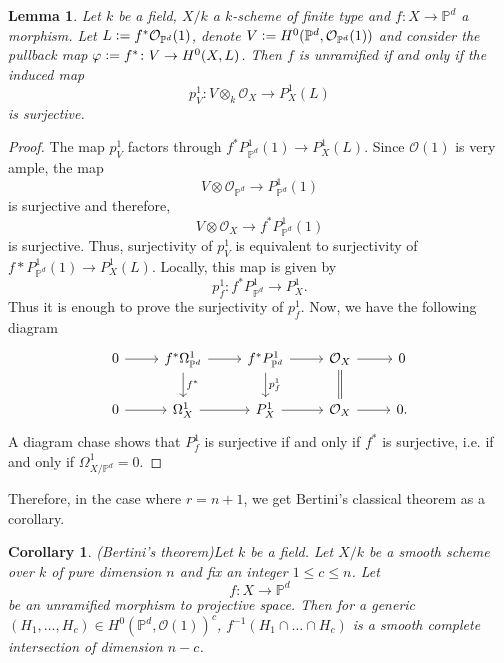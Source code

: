 \documentclass[a4paper,12pt]{amsart}
\newtheorem{corollary}[definition]{Corollary}
\newtheorem{lemma}[definition]{Lemma}
\numberwithin{equation}{section}
\newcommand{\defeq}{\vcentcolon=}
\renewcommand{\leq}{\leqslant}
\renewcommand{\_}{\rule{0.25cm}{0.4pt}}
\begin{document}
\begin{lemma}\label{unramified}
    Let $k$ be a field, $X/k$ a $k$-scheme of finite type and $f\colon X\to\mathbb{P}^{d}$ a morphism. Let $L\defeq f^{\ast}\mathcal{O}_{\mathbb{P}^{d}}(1)$, denote $V\defeq H^{0}(\mathbb{P}^{d},\mathcal{O}_{\mathbb{P}^{d}}(1))$ and consider the pullback map $\varphi\defeq f^{\ast}\colon V\to H^{0}(X,L)$. Then $f$ is unramified if and only if the induced map
    \[
    p^{1}_{V}\colon V\otimes_{k}\mathcal{O}_{X}\to P_{X}^{1}(L)
    \]
    is surjective.
\end{lemma}
\begin{proof}
    The map $p^{1}_{V}$ factors through $f^{\ast} P_{\mathbb{P}^{d}}^{1}(1)\to P^{1}_{X}(L)$. Since $\mathcal{O}(1)$ is very ample, the map
    \[
    V\otimes \mathcal{O}_{\mathbb{P}^{d}}\to P_{\mathbb{P}^{d}}^{1}(1)
    \]
    is surjective and therefore,
    \[
    V\otimes \mathcal{O}_{X}\to f^{\ast}P_{\mathbb{P}^{d}}^{1}(1)
    \]
    is surjective. Thus, surjectivity of $p^{1}_{V}$ is equivalent to surjectivity of $f\ast P_{\mathbb{P}^{d}}^{1}(1)\to P^{1}_{X}(L)$. Locally, this map is given by
    \[
    p^{1}_{f}\colon f^{\ast} P_{\mathbb{P}^{d}}^{1}\to P^{1}_{X}.
    \]
    Thus it is enough to prove the surjectivity of $p^{1}_{f}$. Now, we have the following diagram
    \[
    \begin{tikzcd}
    0\ar[r] & f^{\ast}\Omega^{1}_{\mathbb{P}^{d}}\ar[r]\ar[d, "f^{\ast}"] & f^{\ast}P^{1}_{\mathbb{P}^{d}}\ar[r]\ar[d, "p^{1}_{f}"] & \mathcal{O}_{X}\ar[r]\ar[d, equal] & 0
    \\
    0\ar[r] & \Omega^{1}_{X}\ar[r] & P^{1}_{X}\ar[r] & \mathcal{O}_{X}\ar[r] & 0.
    \end{tikzcd}
    \]
    A diagram chase shows that $P^{1}_{f}$ is surjective if and only if $f^{\ast}$ is surjective, i.e. if and only if $\Omega^{1}_{X/\mathbb{P}^{d}}=0$.
\end{proof}

Therefore, in the case where $r=n+1$, we get Bertini's classical theorem as a corollary.

\begin{corollary}{(Bertini's theorem)}\label{Bertini usual}
    Let $k$ be a field. Let $X/k$ be a smooth scheme over $k$ of pure dimension $n$ and fix an integer $1\leq c\leq n$. Let 
    \[
    f\colon X\to \mathbb{P}^{d}
    \]
    be an unramified morphism to projective space. Then for a generic $(H_{1},\dots, H_{c})\in H^{0}(\mathbb{P}^{d},\mathcal{O}(1))^{c}$, $f^{-1}(H_{1}\cap\dots\cap H_{c})$ is a smooth complete intersection of dimension $n-c$.
\end{corollary}
\end{document}
